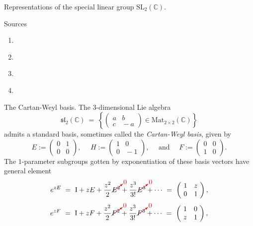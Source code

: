 \documentclass[letterpaper,11pt, reqno]{amsart}
\newtheorem{monodromy theorem}{Monodromy Theorem}[subsection]
\newtheorem{wild conjecture}[theorem]{Wild Conjecture}
\newtheorem{research objectives}{Research objectives}[subsection]
\newtheorem{research question}[theorem]{Research questions}
\newtheorem{aside question}[theorem]{Aside question}
\newtheorem{audio example}[theorem]{\loudspeaker[3] Example}
\newtheorem{blank remark}[theorem]{}
\newtheorem{terminology and comment}[theorem]{Terminology and comment}
\newtheorem{purity hypothesis}[theorem]{Purity hypothesis}
\newtheorem{corollary of the purity hypothesis}[theorem]{Corollary of the purity hypothesis}
\newcommand{\CC} {{\mathbb C}}
\numberwithin{equation}{theorem}
\begin{document}
\begin{section}{Representations of the special linear group $\text{SL}_{2}(\CC)$.}

\begin{subsection}{Sources}
	\begin{enumerate}[{\bf\ \ \ \ \ \ 1.}]
	\item
	\cite{FH}
	\item
	\cite{Proc}
	\item
	\cite{Knapp86}
	\item
	\cite{Knapp02}
	\end{enumerate}
\end{subsection}

\begin{subsection}{The Cartan-Weyl basis.} The $3$-dimensional Lie algebra
	$$
	\mathfrak{sl}_2(\CC)
	\ =\ 
	\left\{
	\left(\!\begin{array}{cc}a & b \\ c & \!\!-a\end{array}\!\right)\in\text{Mat}_{2\times2}(\CC)
	\right\}
	$$
admits a standard basis, sometimes called the {\em Cartan-Weyl basis}, given by
	$$
	E:=\left(\!\begin{array}{cc}0 & 1 \\ 0 & 0\end{array}\!\right),
	\ \ \ \ \ \ 
	H:=\left(\!\begin{array}{cc}1 & 0 \\ 0 & \!\!-1\end{array}\!\right),
	\ \ \ \ \ \ 
	\text{and}
	\ \ \ \ \ \ 
	F:=\left(\!\begin{array}{cc} 0 & 0 \\ 1 & 0\end{array}\!\right).
	$$
The $1$-parameter subgroups gotten by exponentiation of these basis vectors have general element
	$$
	e^{zE}
	\ =\ 
	\text{I}+zE+\frac{z^2}{2}{\color{red} \cancelto{0}{{\color{black} E^2}}}+\frac{z^3}{3!}{\color{red} \cancelto{0}{{\color{black} E^3}}}+\cdots
	\ =\ 
	\left(\!\begin{array}{cc} 1 & z \\ 0 & 1\end{array}\!\right),
	$$
	$$
	e^{zF}
	\ =\ 
	\text{I}+zF+\frac{z^2}{2}{\color{red} \cancelto{0}{{\color{black} F^2}}}+\frac{z^3}{3!}{\color{red} \cancelto{0}{{\color{black} F^3}}}+\cdots
	\ =\ 
	\left(\!\begin{array}{cc} 1 & 0 \\ z & 1\end{array}\!\right),
$$
\end{subsection}
\end{section}
\end{document}
